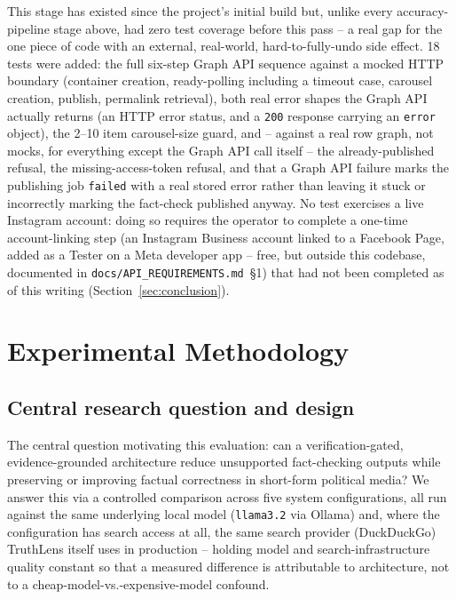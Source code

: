 \documentclass[conference]{IEEEtran}
\begin{document}
This stage has existed since the project's initial build but, unlike
every accuracy-pipeline stage above, had zero test coverage before this
pass -- a real gap for the one piece of code with an external, real-world,
hard-to-fully-undo side effect. 18 tests were added: the full six-step
Graph API sequence against a mocked HTTP boundary (container creation,
ready-polling including a timeout case, carousel creation, publish,
permalink retrieval), both real error shapes the Graph API actually
returns (an HTTP error status, and a \texttt{200} response carrying an
\texttt{error} object), the 2--10 item carousel-size guard, and --
against a real row graph, not mocks, for everything except the Graph API
call itself -- the already-published refusal, the missing-access-token
refusal, and that a Graph API failure marks the publishing job
\texttt{failed} with a real stored error rather than leaving it stuck or
incorrectly marking the fact-check published anyway. No test exercises a
live Instagram account: doing so requires the operator to complete a
one-time account-linking step (an Instagram Business account linked to a
Facebook Page, added as a Tester on a Meta developer app -- free, but
outside this codebase, documented in
\texttt{docs/API\_REQUIREMENTS.md}~\S1) that had not been completed as of
this writing (Section~\ref{sec:conclusion}).

\section{Experimental Methodology}
\label{sec:expmethodology}

\subsection{Central research question and design}
The central question motivating this evaluation: can a verification-gated,
evidence-grounded architecture reduce unsupported fact-checking outputs
while preserving or improving factual correctness in short-form political
media? We answer this via a controlled comparison across five system
configurations, all run against the same underlying local model
(\texttt{llama3.2} via Ollama) and, where the configuration has search
access at all, the same search provider (DuckDuckGo) TruthLens itself uses
in production -- holding model and search-infrastructure quality constant so
that a measured difference is attributable to architecture, not to a
cheap-model-vs.-expensive-model confound.
\end{document}

